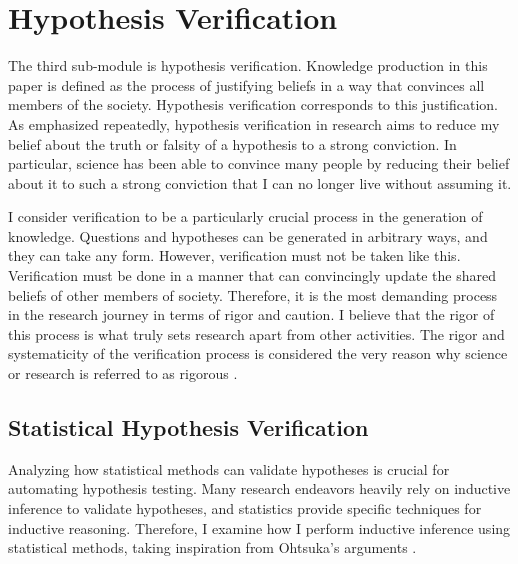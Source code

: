 

\section{Hypothesis Verification}
The third sub-module is hypothesis verification. Knowledge production in this paper is defined as the process of justifying beliefs in a way that convinces all members of the society. Hypothesis verification corresponds to this justification. As emphasized repeatedly, hypothesis verification in research aims to reduce my belief about the truth or falsity of a hypothesis to a strong conviction. In particular, science has been able to convince many people by reducing their belief about it to such a strong conviction that I can no longer live without assuming it.

I consider verification to be a particularly crucial process in the generation of knowledge. Questions and hypotheses can be generated in arbitrary ways, and they can take any form. However, verification must not be taken like this. Verification must be done in a manner that can convincingly update the shared beliefs of other members of society. Therefore, it is the most demanding process in the research journey in terms of rigor and caution. I believe that the rigor of this process is what truly sets research apart from other activities. The rigor and systematicity of the verification process is considered the very reason why science or research is referred to as rigorous \cite{sep-scientific-method,hoyningen2008systematicity,haack2003defending}.

\subsection{Statistical Hypothesis Verification}
Analyzing how statistical methods can validate hypotheses is crucial for automating hypothesis testing. Many research endeavors heavily rely on inductive inference to validate hypotheses, and statistics provide specific techniques for inductive reasoning. Therefore, I examine how I perform inductive inference using statistical methods, taking inspiration from Ohtsuka's arguments \cite{otsuka2022thinking}.

